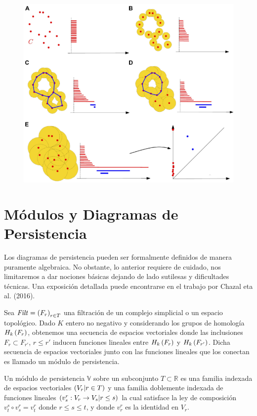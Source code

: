 \begin{figure}[ht]
    \centering
    \includegraphics[width=0.85\linewidth]{./figures/Figura11.png}
    \label{fig:Figura 11}
    \vspace{15pt}
\end{figure}

\newpage

\section{M\'odulos y Diagramas de Persistencia}

Los diagramas de persistencia pueden ser formalmente definidos de manera puramente algebraica.
No obstante, lo anterior requiere de cuidado,
nos limitaremos a dar nociones b\'asicas dejando de lado sutilesas y dificultades t\'ecnicas.
Una exposici\'on detallada puede encontrarse en el trabajo por Chazal eta al. (2016)\cite{Chazal2016a}.

Sea $\mathit{Filt}=\left(F_{r}\right)_{r\in T}$ una filtraci\'on de un complejo simplicial o un espacio topol\'ogico.
Dado $K$ entero no negativo y considerando los grupos de homolog\'ia $H_{k}\left(F_{r}\right)$,
obtenemos una secuencia de espacios vectoriales donde las inclusiones $F_{r}\subset F_{r'}$, $r\leq r'$
inducen funciones lineales entre $H_{k}\left(F_{r}\right)$ y $H_{k}\left(F_{r'}\right)$.
Dicha secuencia de espacios vectoriales junto con las funciones lineales que los conectan es llamado un m\'odulo de persistencia.

\begin{definicion}
    Un m\'odulo de persistencia $\mathbb{V}$ sobre un subconjunto $T\subset\mathbb{R}$
    es una familia indexada de espacios vectoriales $\left(V_{r}|r\in T\right)$
    y una familia doblemente indexada de funciones lineales $\left(v_{s}^{r}:V_{r}\rightarrow V_{s}|r\leq s\right)$
    la cual satisface la ley de composici\'on $v_{t}^{s}\circ v_{s}^{r}=v_{t}^{r}$ donde $r\leq s\leq t$,
    y donde $v_{r}^{r}$ es la identidad en $V_{r}$.
\end{definicion}

